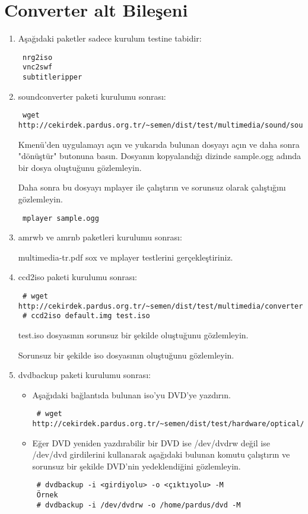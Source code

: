 \documentclass[a4paper,10pt]{article}
\begin{document}
\section{Converter alt Bileşeni}
\begin{enumerate}
 \item Aşağıdaki paketler sadece kurulum testine tabidir:
\begin{verbatim}
 nrg2iso
 vnc2swf
 subtitleripper
\end{verbatim}
\item soundconverter paketi kurulumu sonrası:
\begin{verbatim}
 wget http://cekirdek.pardus.org.tr/~semen/dist/test/multimedia/sound/sound/sample.mp3
\end{verbatim}

Kmenü'den uygulamayı açın ve yukarıda bulunan dosyayı açın ve daha sonra "dönüştür" butonuna basın. Dosyanın kopyalandığı dizinde sample.ogg adında bir dosya oluştuğunu gözlemleyin.

Daha sonra bu dosyayı mplayer ile çalıştırın ve sorunsuz olarak çalıştığını gözlemleyin.
\begin{verbatim}
 mplayer sample.ogg
\end{verbatim}




 \item amrwb ve amrnb paketleri kurulumu sonrası:

 multimedia-tr.pdf sox ve mplayer testlerini gerçekleştiriniz.

\item ccd2iso paketi kurulumu sonrası:
\begin{verbatim}
 # wget http://cekirdek.pardus.org.tr/~semen/dist/test/multimedia/converter/default.img
 # ccd2iso default.img test.iso
\end{verbatim}

test.iso dosyasının sorunsuz bir şekilde oluştuğunu gözlemleyin.

Sorunsuz bir şekilde iso dosyasının oluştuğunu gözlemleyin.
\item dvdbackup paketi kurulumu sonrası:
\begin{itemize}
 \item Aşağıdaki bağlantıda bulunan iso'yu DVD'ye yazdırın. 
\begin{verbatim}
 # wget http://cekirdek.pardus.org.tr/~semen/dist/test/hardware/optical/boot.iso
\end{verbatim}
 \item Eğer DVD yeniden yazdırabilir bir DVD ise /dev/dvdrw değil ise /dev/dvd girdilerini kullanarak aşağıdaki bulunan komutu çalıştırın ve sorunsuz bir şekilde DVD'nin yedeklendiğini gözlemleyin.
\begin{verbatim}
 # dvdbackup -i <girdiyolu> -o <çıktıyolu> -M
 Örnek 
 # dvdbackup -i /dev/dvdrw -o /home/pardus/dvd -M
\end{verbatim}
 

\end{itemize}
\end{enumerate}
\end{document}
